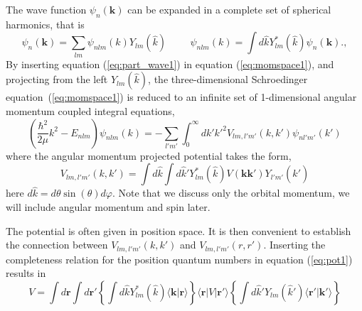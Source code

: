 \documentclass[graybox,sectrefs,envcountresetchap,open=right]{svmonodo}
\begin{document}
\noindent
The wave function $\psi_n(\mathbf{k})$ can be expanded in a complete set of spherical harmonics, that is
\begin{equation}
  \psi_n(\mathbf{k}) = \sum _{lm} \psi_{nlm}(k)Y_{lm}(\hat{k}) \hspace{1cm} \psi_{nlm}(k) = \int d\hat{k} Y_{lm}^*(\hat{k})\psi_n(\mathbf{k}).   , 
  \label{eq:part_wave1}
\end{equation}
By inserting equation (\ref{eq:part_wave1}) in equation (\ref{eq:momspace1}), and projecting from the left
$Y_{lm}(\hat{k})$, the three-dimensional Schroedinger equation~(\ref{eq:momspace1}) is reduced
to an infinite set of  1-dimensional angular momentum coupled integral equations, 
\begin{equation}
  \left( \frac{\hbar^2}{2\mu} k^2-E_{nlm}\right)\psi_{nlm}(k) = -\sum_{l'm'}\int_{0}^\infty dk' {k'}^2 V_{lm, l'm'}(k,k') \psi_{nl'm'}(k') 
  \label{eq:part_wave2}
\end{equation}
where the angular momentum projected potential takes the form,
\begin{equation}
  V_{lm, l'm'}(k,k') = \int d{\hat{k}} \int d{\hat{k}'}Y_{lm}^*(\hat{k})V(\mathbf{k}\mathbf{k'})Y_{l'm'}(\hat{k}')
  \label{eq:pot1}
\end{equation}
here $d\hat{k} = d\theta\sin(\theta)d\varphi$.
Note that we discuss only the orbital momentum, we will include angular momentum and spin later. 



The potential is often given in position space. It is then convenient to establish 
the connection between $V_{lm, l'm'}(k,k')$ and $V_{lm, l'm'}(r,r')$. Inserting 
the completeness relation for the position quantum numbers in equation (\ref{eq:pot1}) results in
\begin{equation}
V =\int d\mathbf{r}\int d\mathbf{r}'\left\{\int d{\hat{k}}Y_{lm}^*(\hat{k})\langle \mathbf{k}\vert \mathbf{r}\rangle\right\}\langle\mathbf{r}\vert V\vert\mathbf{r}'\rangle\left\{\int d\hat{k}'Y_{lm}(\hat{k}')\langle\mathbf{r'}\vert\mathbf{k}'\rangle\right\}
\label{eq:pot2}
\end{equation}
\end{document}
